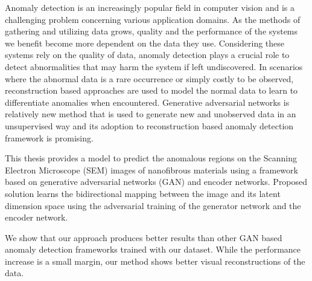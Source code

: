 
\begingroup

Anomaly detection is an increasingly popular field in computer vision and is a challenging 
problem concerning various application domains. As the methods of gathering and utilizing 
data grows, quality and the performance of the systems we benefit become
more dependent on the data they use. Considering these systems rely on the quality of data, anomaly detection 
plays a crucial role to detect abnormalities that may harm the system if left undiscovered. In scenarios where 
the abnormal data is a rare occurrence or simply costly to be observed, reconstruction based approaches 
are used to model the normal data to learn to differentiate anomalies when encountered. Generative adversarial 
networks is relatively new method that is used to generate new and unobserved data in an unsupervised way and 
its adoption to reconstruction based anomaly detection framework is promising.

This thesis provides a model to predict the anomalous regions on the Scanning Electron Microscope (SEM) images 
of nanofibrous materials using a framework based on generative adversarial networks (GAN) and encoder networks. 
Proposed solution learns the bidirectional mapping between the image and its latent dimension space using the adversarial 
training of the generator network and the encoder network. 

We show that our approach produces better results than other GAN based anomaly detection frameworks trained with our 
dataset. While the performance increase is a small margin, our method shows better visual reconstructions of the data.
\endgroup